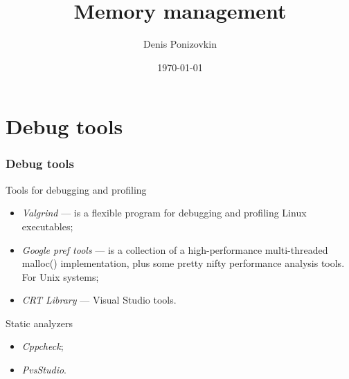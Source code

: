\documentclass{bredelebeamer}
\begin{document}
\title{Memory management}   
\author{Denis Ponizovkin} 
\date{\today} 

\institute[<EPAM>]

\frame{\titlepage} 






\section{Debug tools}
\begin{frame}[fragile]
	\frametitle{Debug tools}
	\begin{exampleblock}{Tools for debugging and profiling}
	\begin{itemize}
		\item \emph{Valgrind} --- is a flexible program for debugging and profiling Linux executables;
		\item \emph{Google pref tools} --- is a collection of a high-performance multi-threaded malloc()
			implementation, plus some pretty nifty performance analysis tools. For Unix systems;
		\item \emph{CRT Library} --- Visual Studio tools.
	\end{itemize}
	\end{exampleblock}

	\begin{exampleblock}{Static analyzers}
	\begin{itemize}
		\item \emph{Cppcheck};
		\item \emph{PvsStudio}.
	\end{itemize}
	\end{exampleblock}
\end{frame}
\end{document}
